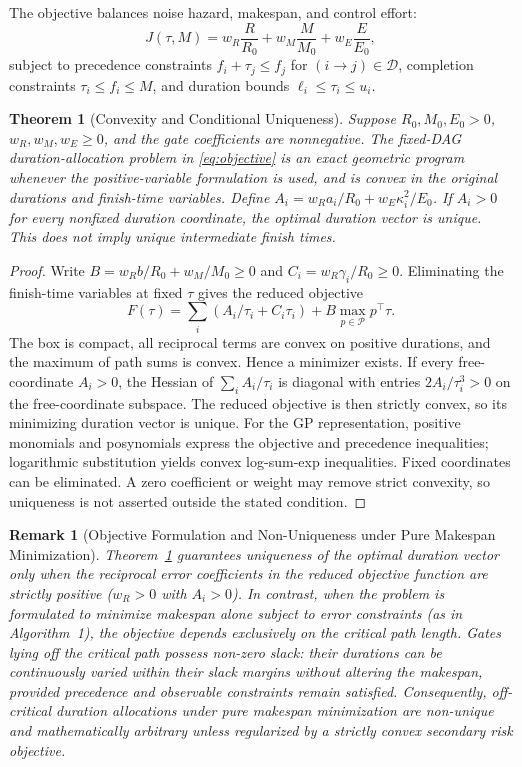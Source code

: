 \documentclass[10pt,letterpaper,journal]{IEEEtran}
\newtheorem{theorem}{Theorem}
\newtheorem{remark}{Remark}
\begin{document}
The objective balances noise hazard, makespan, and control effort:
\begin{equation}\label{eq:objective}
J(\tau, M) = w_R \frac{R}{R_0} + w_M \frac{M}{M_0} + w_E \frac{E}{E_0},
\end{equation}
subject to precedence constraints $f_i + \tau_j \le f_j$ for $(i \to j) \in \mathcal{D}$, completion constraints $\tau_i \le f_i \le M$, and duration bounds $\ell_i \le \tau_i \le u_i$.

\begin{theorem}[Convexity and Conditional Uniqueness]\label{th:exactness}
Suppose $R_0,M_0,E_0>0$, $w_R,w_M,w_E\ge0$, and the gate coefficients are nonnegative. The fixed-DAG duration-allocation problem in \eqref{eq:objective} is an exact geometric program whenever the positive-variable formulation is used, and is convex in the original durations and finish-time variables. Define $A_i=w_Ra_i/R_0+w_E\kappa_i^2/E_0$. If $A_i>0$ for every nonfixed duration coordinate, the optimal duration vector is unique. This does not imply unique intermediate finish times.
\end{theorem}
\begin{proof}
Write $B=w_Rb/R_0+w_M/M_0\ge0$ and $C_i=w_R\gamma_i/R_0\ge0$. Eliminating the finish-time variables at fixed $\tau$ gives the reduced objective
\[F(\tau)=\sum_i(A_i/\tau_i+C_i\tau_i)+B\max_{p\in\mathcal P}p^\top\tau.\]
The box is compact, all reciprocal terms are convex on positive durations, and the maximum of path sums is convex. Hence a minimizer exists. If every free-coordinate $A_i>0$, the Hessian of $\sum_iA_i/\tau_i$ is diagonal with entries $2A_i/\tau_i^3>0$ on the free-coordinate subspace. The reduced objective is then strictly convex, so its minimizing duration vector is unique. For the GP representation, positive monomials and posynomials express the objective and precedence inequalities; logarithmic substitution yields convex log-sum-exp inequalities. Fixed coordinates can be eliminated. A zero coefficient or weight may remove strict convexity, so uniqueness is not asserted outside the stated condition.
\end{proof}

\begin{remark}[Objective Formulation and Non-Uniqueness under Pure Makespan Minimization]\label{rem:uniqueness}
Theorem~\ref{th:exactness} guarantees uniqueness of the optimal duration vector only when the reciprocal error coefficients in the reduced objective function are strictly positive ($w_R > 0$ with $A_i > 0$). In contrast, when the problem is formulated to minimize makespan alone subject to error constraints (as in Algorithm~1), the objective depends exclusively on the critical path length. Gates lying off the critical path possess non-zero slack: their durations can be continuously varied within their slack margins without altering the makespan, provided precedence and observable constraints remain satisfied. Consequently, off-critical duration allocations under pure makespan minimization are non-unique and mathematically arbitrary unless regularized by a strictly convex secondary risk objective.
\end{remark}
\end{document}
